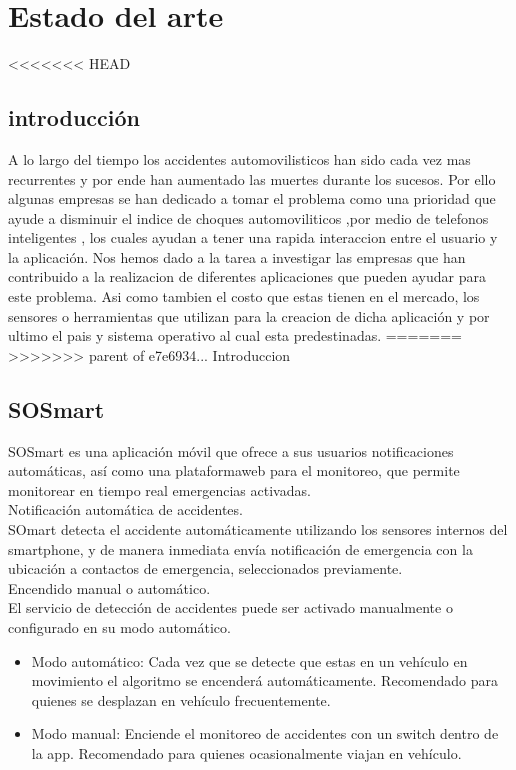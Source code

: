 \section{Estado del arte}

<<<<<<< HEAD
\subsection{introducción}

A lo largo del tiempo los  accidentes automovilisticos han sido cada vez mas recurrentes y por ende han aumentado las muertes durante los sucesos. Por ello algunas empresas se han dedicado a tomar el problema como una prioridad que ayude a disminuir el indice de choques automoviliticos ,por medio de telefonos inteligentes , los cuales ayudan a tener una rapida interaccion entre el usuario y la aplicación.
Nos hemos dado a la tarea a investigar las empresas que han contribuido a la realizacion de diferentes aplicaciones que pueden ayudar para este problema. Asi como tambien el costo que estas tienen en el mercado, los sensores o herramientas que utilizan para la creacion de dicha aplicación y por ultimo el pais y sistema operativo al cual esta predestinadas.
=======
>>>>>>> parent of e7e6934... Introduccion

\subsection{SOSmart}
SOSmart es una aplicación móvil que ofrece a sus usuarios notificaciones automáticas, así como una plataformaweb para el monitoreo, que permite monitorear en tiempo real emergencias activadas.\\

Notificación automática de accidentes.\\
SOmart detecta el accidente automáticamente utilizando los sensores internos del smartphone, y de manera inmediata envía notificación de emergencia con la ubicación a contactos de emergencia, seleccionados previamente.\\

Encendido manual o automático.\\
El servicio de detección de accidentes puede ser activado manualmente o configurado en su modo automático.
\begin{itemize}
	\item Modo automático: Cada vez que se detecte que estas en un vehículo en movimiento el algoritmo se encenderá automáticamente. Recomendado para quienes se desplazan en vehículo frecuentemente.
	
	\item Modo manual: Enciende el monitoreo de accidentes con un switch dentro de la app. Recomendado para quienes ocasionalmente viajan en vehículo.\\
\end{itemize}


